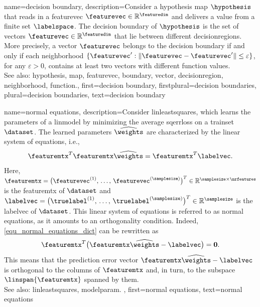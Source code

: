 {name={decision boundary}, 
	description={Consider a 
		\gls{hypothesis} \gls{map} $\hypothesis$ that reads in a \gls{featurevec}  
		$\featurevec \in \mathbb{R}^{\featuredim}$ and delivers a value from a finite set $\labelspace$. 
		The decision \gls{boundary} of $\hypothesis$ is the set of \glspl{vector} $\featurevec \in \mathbb{R}^{\featuredim}$ 
		that lie between different \glspl{decisionregion}. More precisely, a 
		\gls{vector} $\featurevec$ belongs to the decision \gls{boundary} if and only 
		if each \gls{neighborhood} $\{ \featurevec': \| \featurevec - \featurevec' \| \leq \varepsilon \}$, 
		for any $\varepsilon >0$, contains at least two \glspl{vector} with different \gls{function} values.
				\\
		See also: \gls{hypothesis}, \gls{map}, \gls{featurevec}, \gls{boundary}, \gls{vector}, \gls{decisionregion}, 
		\gls{neighborhood}, \gls{function}.},
	first={decision boundary},
	firstplural={decision boundaries},
	plural={decision boundaries},
	text={decision boundary} 
}

{name={normal equations}, 
	description={Consider \gls{linleastsquares}, which learns the \glspl{parameter} of a 
		\gls{linmodel} by minimizing the average \gls{sqerrloss} on a 
		\gls{trainset} $\dataset$. 
		The learned \glspl{parameter} $\widehat{\weights}$ are characterized by the 
		linear system of equations, i.e.,
		\begin{equation} 
			\label{equ_normal_equations_dict}
			\featuremtx^{T} \featuremtx \widehat{\weights} = \featuremtx^{T} \labelvec.
		\end{equation} 
		Here, $\featuremtx=\big(\featurevec^{(1)},\,\ldots,\,\featurevec^{(\samplesize)}\big)^{T} \in \mathbb{R}^{\samplesize \times \nrfeatures}$ 
		is the \gls{featuremtx} of $\dataset$ and $\labelvec=\big(\truelabel^{(1)},\,\ldots,\,\truelabel^{(\samplesize)} \big)^{T} \in \mathbb{R}^{\samplesize}$ 
		is the \gls{labelvec} of $\dataset$. This linear system of equations is referred 
		to as normal equations, as it amounts to an orthogonality condition. Indeed, \eqref{equ_normal_equations_dict} 
		can be rewritten as $$ \featuremtx^{T} \big( \featuremtx \widehat{\weights} - \labelvec \big) = \mathbf{0}.$$
		This means that the \gls{prediction} error \gls{vector} $\featuremtx \widehat{\weights} - \labelvec$ 
		is orthogonal to the columns of $\featuremtx$ and, in turn, to the \gls{subspace} $\linspan{\featuremtx}$
		spanned by them.
		\\ 
		See also: \gls{linleastsquares}, \gls{modelparam}. },
	first={normal equations},
	text={normal equations} 
}

